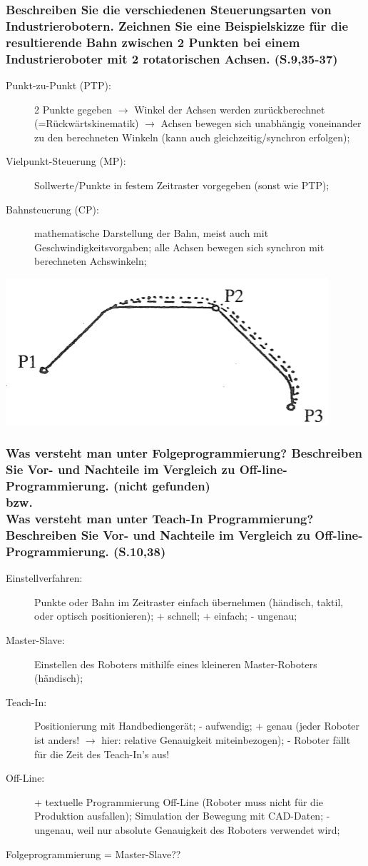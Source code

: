 \subsubsection*{Beschreiben Sie die verschiedenen Steuerungsarten von Industrierobotern. Zeichnen
  Sie eine Beispielskizze für die resultierende Bahn zwischen 2 Punkten bei einem 
  Industrieroboter mit 2 rotatorischen Achsen. (S.9,35-37)}
\begin{description}
\item[Punkt-zu-Punkt (PTP):] 2 Punkte gegeben $\rightarrow$ Winkel der Achsen werden 
  zurückberechnet (=Rückwärtskinematik) $\rightarrow$ Achsen bewegen sich unabhängig 
  voneinander zu den berechneten Winkeln (kann auch gleichzeitig/synchron erfolgen);
\item[Vielpunkt-Steuerung (MP):] Sollwerte/Punkte in festem Zeitraster vorgegeben (sonst
  wie PTP);
\item[Bahnsteuerung (CP):] mathematische Darstellung der Bahn, meist auch mit 
  Geschwindigkeitsvorgaben; alle Achsen bewegen sich synchron mit berechneten Achswinkeln;
\end{description}
\includegraphics[width=.4\textwidth]{pics/ptp_bsp}

\subsubsection*{Was versteht man unter Folgeprogrammierung? Beschreiben Sie Vor- und Nachteile
  im Vergleich zu Off-line-Programmierung. (nicht gefunden) \\ bzw. \\
  Was versteht man unter Teach-In Programmierung? Beschreiben Sie Vor- und Nachteile im 
  Vergleich zu Off-line-Programmierung. (S.10,38)}
\begin{description}
\item[Einstellverfahren:] Punkte oder Bahn im Zeitraster einfach übernehmen (händisch, taktil,
  oder optisch positionieren); + schnell; + einfach; - ungenau;
\item[Master-Slave:] Einstellen des Roboters mithilfe eines kleineren Master-Roboters 
  (händisch); 
\item[Teach-In:] Positionierung mit Handbediengerät; 
  - aufwendig; + genau (jeder Roboter ist anders! $\rightarrow$ hier: relative
  Genauigkeit miteinbezogen); - Roboter fällt für die Zeit des Teach-In's aus!
\item[Off-Line:] + textuelle Programmierung Off-Line (Roboter muss nicht für die Produktion 
  ausfallen); Simulation der Bewegung mit CAD-Daten; - ungenau, weil nur absolute Genauigkeit 
  des Roboters verwendet wird;
\end{description}
Folgeprogrammierung = Master-Slave??
